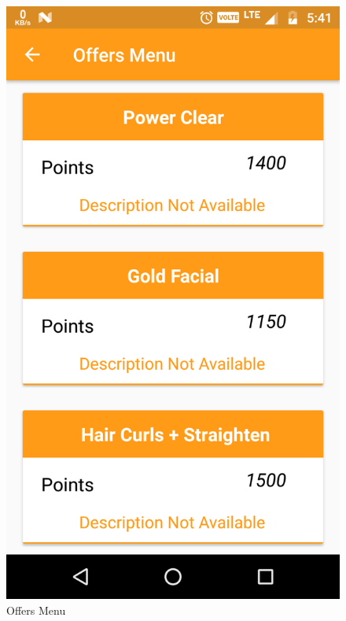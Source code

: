 \\
\begin{figure}[h]
	\centering
	\includegraphics[width=0.7\linewidth]{OffersMenu}
	\caption{Offers Menu}
\end{figure}
\pagebreak

